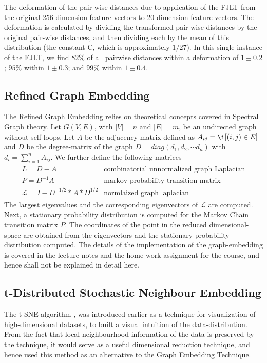 \documentclass[10pt]{article}
\begin{document}
The deformation of the pair-wise distances due to application of the FJLT from the original 256 dimension feature vectors to 20 dimension feature vectors.  The deformation is calculated by dividing the transformed pair-wise distances by the original pair-wise distances, and then dividing each by the mean of this distribution (the constant C, which is approximately $1/27$).  In this single instance of the FJLT, we find $82\%$ of all pairwise distances within a deformation of $1 \pm 0.2$;   $95\%$ within $1 \pm 0.3$;  and $99\%$ within $1 \pm 0.4$.   


\subsection{Refined Graph Embedding}
The Refined Graph Embedding relies on theoretical concepts covered in Spectral Graph theory. Let $G(V,E)$, with $|V| = n$ and $|E| = m $, be an undirected graph without self-loops. Let $A$ be the adjacency matrix defined as $A_{ij} = \i[(i,j) \in E]$ and $D$ be the degree-matrix of the graph $D = diag(d_1, d_2, \cdots d_n)$ with $d_i = \sum_{i=1}^n A_{ij}$. We further define the following matrices
\begin{align}
\begin{array}{cc}
L = D-A & \text{combinatorial unnormalized graph Laplacian}\\
P = D^{-1}A & \text{markov probability transition matrix}\\
\mathcal{L} = I - D^{-1/2}*A*D^{1/2} & \text{normlaized graph laplacian}
\end{array}
\end{align}
The largest eigenvalues and the corresponding eigenvectors of $\mathcal{L}$ are computed. Next, a stationary probability distribution is computed for the Markov Chain transition matrix $P$. The coordinates of the point in the reduced dimensional-space are obtained from the eigenvectors and the stationary-probability distribution computed. 
The details of the implementation of the graph-embedding is covered in the lecture notes \cite{fmeyer} and the home-work assignment for the course, and hence shall not be explained in detail here. 

\subsection{t-Distributed Stochastic Neighbour Embedding}
The t-SNE algorithm \cite{tSNEdataViz}, was introduced earlier as a technique for visualization of high-dimensional datasets, to built a visual intuition of the data-distribution. From the fact that local neighbourhood information of the data is preserved by the technique, it would serve as a useful dimensional reduction technique, and hence used this method as an alternative to the Graph Embedding Technique.
\end{document}
